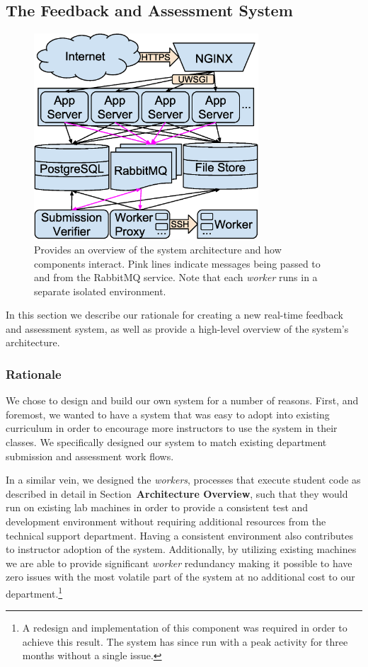 \subsection{The Feedback and Assessment System}

\begin{figure}[!t]
\centering \includegraphics[width=3.3in]{graphs/architecture.eps}
\caption{Provides an overview of the system architecture and how components
  interact. Pink lines indicate messages being passed to and from the RabbitMQ
  service. Note that each \emph{worker} runs in a separate isolated
  environment.}
\end{figure}

In this section we describe our rationale for creating a new real-time feedback
and assessment system, as well as provide a high-level overview of the system's
architecture.

\subsubsection{Rationale}
We chose to design and build our own system for a number of reasons. First, and
foremost, we wanted to have a system that was easy to adopt into existing
curriculum in order to encourage more instructors to use the system in their
classes. We specifically designed our system to match existing department
submission and assessment work flows.

In a similar vein, we designed the \emph{workers}, processes that execute
student code as described in detail in Section~\textbf{Architecture Overview},
such that they would run on existing lab machines in order to provide a
consistent test and development environment without requiring additional
resources from the technical support department. Having a consistent
environment also contributes to instructor adoption of the
system. Additionally, by utilizing existing machines we are able to provide
significant \emph{worker} redundancy making it possible to have zero issues
with the most volatile part of the system at no additional cost to our
department.\footnote{A redesign and implementation of this component was
  required in order to achieve this result. The system has since run with a
  peak activity for three months without a single issue.}

